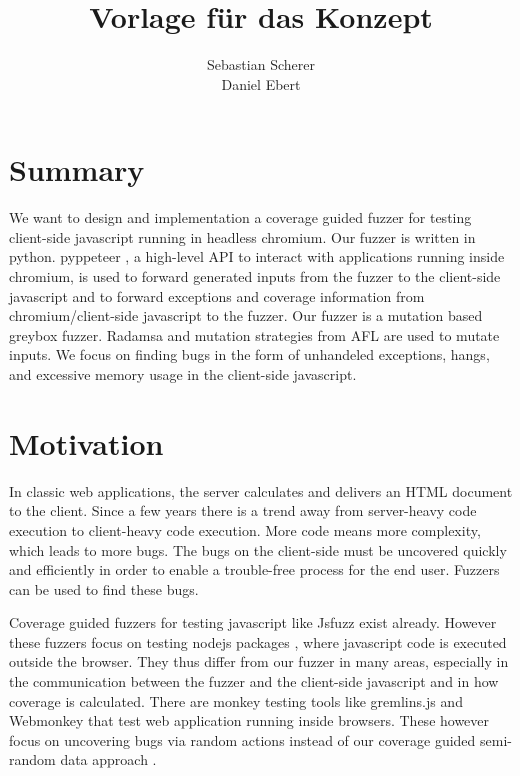 \documentclass[12pt]{article}
\title{Vorlage für das Konzept}
\author{Sebastian Scherer\\
	Daniel Ebert}
\date{}
\begin{document}
	\maketitle
	
\section{Summary}
	
We want to design and implementation a coverage guided fuzzer for testing client-side javascript running in headless chromium. Our fuzzer is written in python. pyppeteer \cite{6}, a high-level API to interact with applications running inside chromium, is used to forward generated inputs from the fuzzer to the client-side javascript and to forward exceptions and coverage information from chromium/client-side javascript to the fuzzer. Our fuzzer is a mutation based greybox fuzzer. Radamsa and mutation strategies from AFL are used to mutate inputs. We focus on finding bugs in the form of unhandeled exceptions, hangs, and excessive memory usage in the client-side javascript.


\section{Motivation}

In classic web applications, the server calculates and delivers an HTML document to the client. Since a few years there is a trend away from server-heavy code execution to client-heavy code execution. More code means more complexity, which leads to more bugs. The bugs on the client-side must be uncovered quickly and efficiently in order to enable a trouble-free process for the end user. Fuzzers can be used to find these bugs.

Coverage guided fuzzers for testing javascript like Jsfuzz \cite{1} \cite{2} exist already. However these fuzzers focus on testing nodejs packages \cite{1} \cite{2}, where javascript code is executed outside the browser. They thus differ from our fuzzer in many areas, especially in the communication between the fuzzer and the client-side javascript and in how coverage is calculated. There are monkey testing tools like gremlins.js \cite{3} and Webmonkey \cite{4} that test web application running inside browsers. These however focus on uncovering bugs via random actions instead of our coverage guided semi-random data approach \cite{3} \cite{4} \cite{5}.
\end{document}
